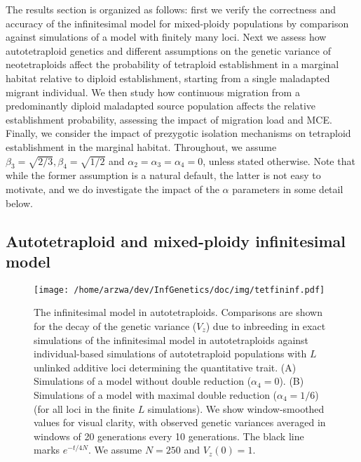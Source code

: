 \documentclass[12pt,a4paper]{article}
\begin{document}
The results section is organized as follows: first we verify the correctness
and accuracy of the infinitesimal model for mixed-ploidy populations by
comparison against simulations of a model with finitely many loci.
Next we assess how autotetraploid genetics and different assumptions on the
genetic variance of neotetraploids affect the probability of tetraploid
establishment in a marginal habitat relative to diploid establishment, starting
from a single maladapted migrant individual.
We then study how continuous migration from a predominantly diploid maladapted
source population affects the relative establishment probability, assessing the
impact of migration load and MCE.
Finally, we consider the impact of prezygotic isolation mechanisms on
tetraploid establishment in the marginal habitat.
Throughout, we assume $\beta_3 = \sqrt{2/3}, \beta_4=\sqrt{1/2}$
and $\alpha_2 = \alpha_3 = \alpha_4 = 0$, unless stated otherwise.
Note that while the former assumption is a natural default, the latter is not
easy to motivate, and we do investigate the impact of the $\alpha$ parameters
in some detail below.

\subsection*{Autotetraploid and mixed-ploidy infinitesimal model}

\begin{figure}[t]
\centering
\texttt{[image: /home/arzwa/dev/InfGenetics/doc/img/tetfininf.pdf]}
\caption{
The infinitesimal model in autotetraploids.
Comparisons are shown for the decay of the genetic variance ($V_z$) due to
inbreeding in exact simulations of the infinitesimal model in autotetraploids
against individual-based simulations of autotetraploid populations with $L$
unlinked additive loci determining the quantitative trait. 
(A) Simulations of a model without double reduction ($\alpha_4=0$).
(B) Simulations of a model with maximal double reduction ($\alpha_4=1/6$) (for
all loci in the finite $L$ simulations).
We show window-smoothed values for visual clarity, with observed genetic
variances averaged in windows of 20 generations every 10 generations.
The black line marks $e^{-t/4N}$. 
We assume $N=250$ and $V_z(0) = 1$.
\label{fig:vztet}}
\end{figure}
\end{document}
